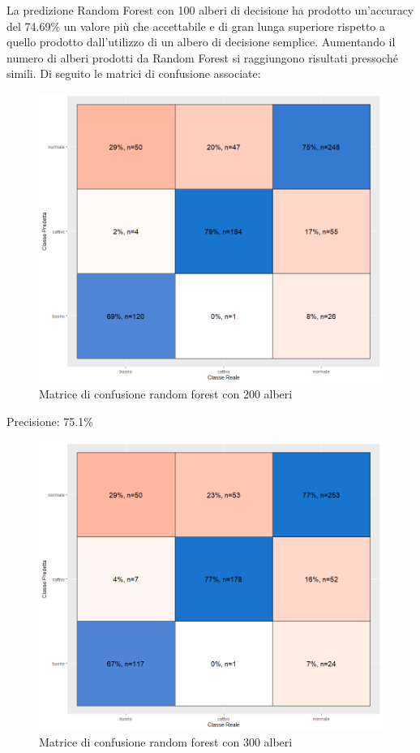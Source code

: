 \documentclass[12pt]{article}
\begin{document}
\FloatBarrier
La predizione Random Forest con 100 alberi di decisione ha prodotto un'accuracy del 74.69\% un valore più che accettabile e di gran lunga superiore rispetto a quello prodotto dall'utilizzo di un albero di decisione semplice. Aumentando il numero di alberi prodotti da Random Forest si raggiungono risultati pressoché simili. Di seguito le matrici di confusione associate:
\begin{figure}[!htb]
    \centering
    \includegraphics[width=1\textwidth]{immagini/conf200.png}
    \caption{Matrice di confusione random forest con 200 alberi}
\end{figure}
\FloatBarrier
Precisione: 75.1\%
\begin{figure}[!htb]
    \centering
    \includegraphics[width=1\textwidth]{immagini/300conf.png}
    \caption{Matrice di confusione random forest con 300 alberi}
\end{figure}
\end{document}
